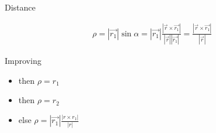 \documentclass[10pt]{beamer}
\begin{document}
\begin{frame}{Distance}
		\begin{figure}[h]
		\end{figure}
		\begin{align*}
				\rho  = |\overrightarrow{r_1}|\sin\alpha 
				      = |\overrightarrow{r_1}|\frac{|\overrightarrow{r} \times \overrightarrow{r_1}|}
				                                   {|\overrightarrow{r}||\overrightarrow{r_1}|}
				      = \frac{|\overrightarrow{r}\times \overrightarrow{r_1}|}{|\overrightarrow{r}|}
		\end{align*}
\end{frame}
\begin{frame}{Improving}
		\begin{figure}[h]
		\end{figure}
			\begin{itemize}
				\item{  then $\rho=r_1$}
				\item{  then $\rho=r_2$}
				\item{ \makebox[2.5cm]{} else $\rho = |\overrightarrow{r_1}|\frac{|r\times r_1|}{|r|}$}
			\end{itemize}
\end{frame}
\end{document}
